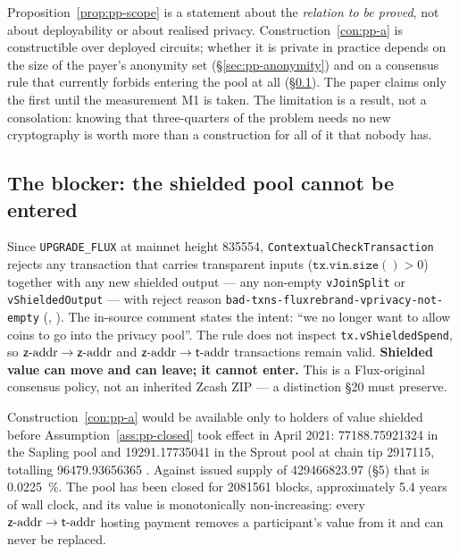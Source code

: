 \begin{remark}
\label{rem:pp-constructible}
Proposition~\ref{prop:pp-scope} is a statement about the \emph{relation to be proved}, not about
deployability or about realised privacy. Construction~\ref{con:pp-a} is constructible over deployed
circuits; whether it is private in practice depends on the size of the payer's anonymity set
(\S\ref{sec:pp-anonymity}) and on a consensus rule that currently forbids entering the pool at all
(\S\ref{sec:pp-blocker}). The paper claims only the first until the measurement M1 is taken. The
limitation is a result, not a consolation: knowing that three-quarters of the problem needs no new
cryptography is worth more than a construction for all of it that nobody has.
\end{remark}

\subsection{The blocker: the shielded pool cannot be entered}
\label{sec:pp-blocker}

\begin{assumption}
\label{ass:pp-closed}
Since \texttt{UPGRADE\_FLUX} at mainnet height \num{835554},
\texttt{Contextual\allowbreak{}Check\allowbreak{}Transaction} rejects any transaction that carries transparent inputs
($\mathtt{tx.vin.size()} > 0$) together with any new shielded output --- any non-empty
\texttt{vJoinSplit} or \texttt{v\allowbreak{}Shielded\allowbreak{}Output} --- with reject reason
\texttt{bad-\allowbreak{}txns-\allowbreak{}fluxrebrand-\allowbreak{}vprivacy-\allowbreak{}not-\allowbreak{}empty}
(\shipped, ). The in-source comment states the intent: ``we no
longer want to allow coins to go into the privacy pool''. The rule does not inspect
\texttt{tx.\allowbreak{}v\allowbreak{}Shielded\allowbreak{}Spend}, so $\mathsf{z}\text{-addr} \to \mathsf{z}\text{-addr}$ and $\mathsf{z}\text{-addr} \to \mathsf{t}\text{-addr}$ transactions remain valid.
\textbf{Shielded value can move and can leave; it cannot enter.} This is a Flux-original consensus
policy, not an inherited Zcash ZIP --- a distinction \S20 must preserve.
\end{assumption}

\begin{corollary}
\label{cor:pp-who}
Construction~\ref{con:pp-a} would be available only to holders of value shielded before
Assumption~\ref{ass:pp-closed} took effect in April 2021: \num{77188.75921324}\flux{} in the Sapling
pool and \num{19291.17735041}\flux{} in the Sprout pool at chain tip \num{2917115}, totalling
\num{96479.93656365}\flux{}
. Against issued
supply of \num{429466823.97}\flux{} (\S5) that is \qty{0.0225}{\percent}. The pool has been closed for
\num{2081561} blocks, approximately \num{5.4} years of wall clock, and its value is
monotonically non-increasing: every $\mathsf{z}\text{-addr} \to \mathsf{t}\text{-addr}$ hosting payment removes a participant's value
from it and can never be replaced.
\end{corollary}

